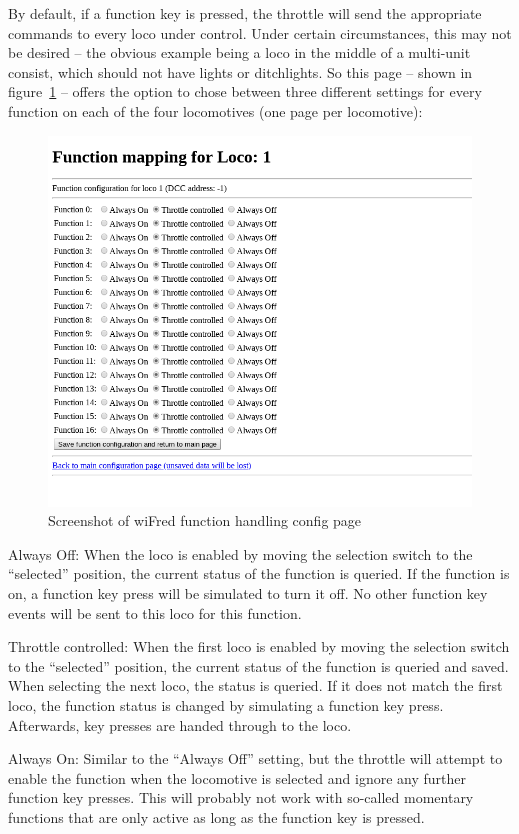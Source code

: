 \documentclass[11pt,a4paper]{scrartcl}
\begin{document}
By default, if a function key is pressed, the throttle will send the appropriate commands to every loco under control. Under certain circumstances, this may not be desired -- the obvious example being a loco in the middle of a multi-unit consist, which should not have lights or ditchlights. So this page -- shown in figure~\ref{throttleConfigFunctionPage} -- offers the option to chose between three different settings for every function on each of the four locomotives (one page per locomotive):

\begin{figure}[tbhp]
  \centering
  \includegraphics[width=0.8 \textwidth]{images/wiFred_function_page}
  \caption{Screenshot of wiFred function handling config page}
  \label{throttleConfigFunctionPage}
\end{figure}

\begin{description}
\item{Always Off:} When the loco is enabled by moving the selection switch to the ``selected'' position, the current status of the function is queried. If the function is on, a function key press will be simulated to turn it off. No other function key events will be sent to this loco for this function.
\item{Throttle controlled:} When the first loco is enabled by moving the selection switch to the ``selected'' position, the current status of the function is queried and saved. When selecting the next loco, the status is queried. If it does not match the first loco, the function status is changed by simulating a function key press. Afterwards, key presses are handed through to the loco.
\item{Always On:} Similar to the ``Always Off'' setting, but the throttle will attempt to enable the function when the locomotive is selected and ignore any further function key presses. This will probably not work with so-called momentary functions that are only active as long as the function key is pressed.
\end{description}
\end{document}
